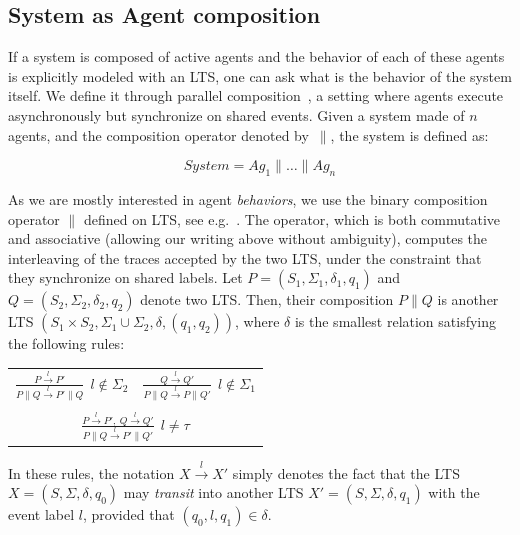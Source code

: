 \subsection{System as Agent composition}

If a system is composed of active agents and the behavior of each of these agents is explicitly modeled with an LTS, one can ask what is the behavior of the system itself. We define it through parallel composition~\cite{Hoare:1985}, a setting where agents execute asynchronously but synchronize on shared events. Given a system made of $n$ agents, and the composition operator denoted by~$\parallel$, the system is defined as:

\begin{equation}
System = Ag_1 \parallel \ldots \parallel Ag_n
\end{equation}

As we are mostly interested in agent \emph{behaviors}, we use the binary composition operator $\parallel$ defined on LTS, see e.g.~\cite{Giannakopoulou:1999, Magee:1999}. The operator, which is both commutative and associative (allowing our writing above without ambiguity), computes the interleaving of the traces accepted by the two LTS, under the constraint that they synchronize on shared labels. Let $P = (S_1,\Sigma_1,\delta_1,q_{1})$ and $Q = (S_2,\Sigma_2,\delta_2,q_{2})$ denote two LTS. Then, their composition $P \parallel Q$ is another LTS $(S_1 \times S_2,\Sigma_1\cup\Sigma_2,\delta,(q_1,q_2))$, where $\delta$ is the smallest relation satisfying the following rules:

\begin{center}
\begin{tabular}{cc}
$\frac{\displaystyle P \stackrel{l}{\longrightarrow} P'}{\displaystyle P \parallel Q \stackrel{l}{\longrightarrow} P' \parallel Q}~~l \notin \Sigma_2$ &
$\frac{\displaystyle Q \stackrel{l}{\longrightarrow} Q'}{\displaystyle P \parallel Q \stackrel{l}{\longrightarrow} P \parallel Q'}~~l \notin \Sigma_1$ \\
 & \\
\multicolumn{2}{c}{$\frac{\displaystyle P \stackrel{l}{\longrightarrow} P',~Q \stackrel{l}{\longrightarrow} Q'}{\displaystyle P \parallel Q \stackrel{l}{\longrightarrow} P' \parallel Q'}~~l \neq \tau$} \\
\end{tabular}
\end{center}

In these rules, the notation $X \stackrel{l}{\longrightarrow} X'$ simply denotes the fact that the LTS $X = (S,\Sigma,\delta,q_0)$ may \emph{transit} into another LTS $X' = (S,\Sigma,\delta,q_1)$ with the event label $l$, provided that $(q_0,l,q_1) \in \delta$. 

